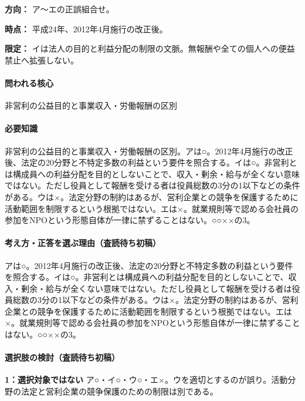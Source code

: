 \noindent\textbf{方向：} ア〜エの正誤組合せ。\par

\noindent\textbf{時点：} 平成24年、2012年4月施行の改正後。\par

\noindent\textbf{限定：} イは法人の目的と利益分配の制限の文脈。無報酬や全ての個人への便益禁止へ拡張しない。\par

\paragraph{問われる核心} 非営利の公益目的と事業収入・労働報酬の区別

\paragraph{必要知識} 非営利の公益目的と事業収入・労働報酬の区別。アは○。2012年4月施行の改正後、法定の20分野と不特定多数の利益という要件を照合する。イは○。非営利とは構成員への利益分配を目的としないことで、収入・剰余・給与が全くない意味ではない。ただし役員として報酬を受ける者は役員総数の3分の1以下などの条件がある。ウは×。法定分野の制約はあるが、営利企業との競争を保護するために活動範囲を制限するという根拠ではない。エは×。就業規則等で認める会社員の参加をNPOという形態自体が一律に禁ずることはない。○○××の3。

\paragraph{考え方・正答を選ぶ理由（査読待ち初稿）} アは○。2012年4月施行の改正後、法定の20分野と不特定多数の利益という要件を照合する。イは○。非営利とは構成員への利益分配を目的としないことで、収入・剰余・給与が全くない意味ではない。ただし役員として報酬を受ける者は役員総数の3分の1以下などの条件がある。ウは×。法定分野の制約はあるが、営利企業との競争を保護するために活動範囲を制限するという根拠ではない。エは×。就業規則等で認める会社員の参加をNPOという形態自体が一律に禁ずることはない。○○××の3。

\paragraph{選択肢の検討（査読待ち初稿）}\mbox{}\par

\noindent\textbf{1：選択対象ではない} ア○・イ○・ウ○・エ×。ウを適切とするのが誤り。活動分野の法定と営利企業の競争保護のための制限は別である。\par


